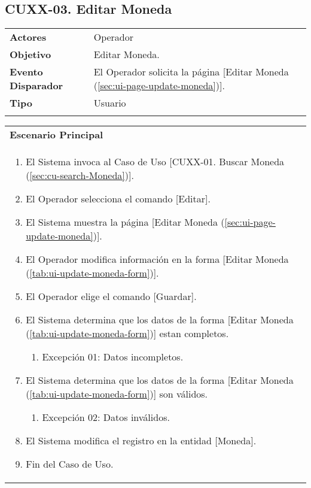 \clearpage
\subsection{CUXX-03. Editar Moneda} \label{sec:cu-update-Moneda}

\begin{tabular}{ p{3.5cm} p{11.5cm} }
	\textbf{Actores} & Operador\\
	\textbf{Objetivo} & Editar Moneda.\\
	\textbf{Evento Disparador} & El Operador solicita la página [Editar Moneda (\ref{sec:ui-page-update-moneda})].\\
	\textbf{Tipo} & Usuario\\
	\\
\end{tabular}

\begin{tabular}{ p{15.5cm} }
	\textbf{Escenario Principal} \\
	\begin{enumerate}
		\item El Sistema invoca al Caso de Uso [CUXX-01. Buscar Moneda (\ref{sec:cu-search-Moneda})].
		\item El Operador selecciona el comando [Editar].
		\item El Sistema muestra la página [Editar Moneda (\ref{sec:ui-page-update-moneda})].
		\item El Operador modifica información en la forma [Editar Moneda (\ref{tab:ui-update-moneda-form})].
		\item El Operador elige el comando [Guardar].
		\item El Sistema determina que los datos de la forma [Editar Moneda (\ref{tab:ui-update-moneda-form})] estan completos.
			\begin{enumerate}
				\item Excepción 01: Datos incompletos.
			\end{enumerate}
		\item El Sistema determina que los datos de la forma [Editar Moneda (\ref{tab:ui-update-moneda-form})] son válidos.
			\begin{enumerate}
				\item Excepción 02: Datos inválidos.
			\end{enumerate}
		\item El Sistema modifica el registro en la entidad [Moneda].
		\item Fin del Caso de Uso.
	\end{enumerate}
\end{tabular}

